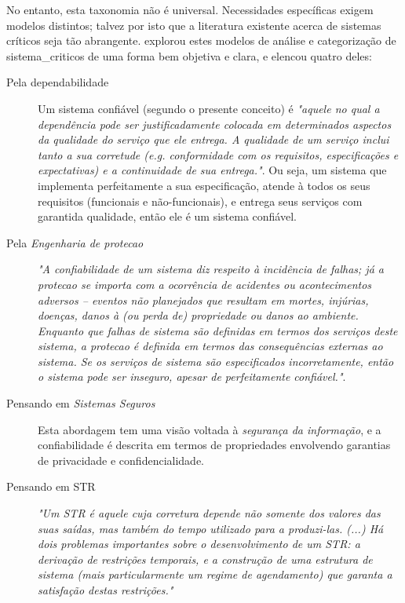     No entanto, esta taxonomia não é universal. Necessidades específicas exigem 
    modelos distintos; talvez por isto que a literatura existente acerca de 
    sistemas críticos seja tão abrangente.  
    explorou estes modelos de análise e categorização de 
    \glspl{sistema_critico} de uma forma bem objetiva e clara, e elencou quatro 
    deles:
    
    \begin{description}
        \item[Pela \Gls{dependabilidade}] Um sistema confiável 
        (segundo o presente conceito) é \emph{"aquele no qual a dependência 
        pode ser justificadamente colocada em determinados aspectos da 
        qualidade do serviço que ele entrega. A qualidade de um serviço inclui 
        tanto a sua corretude (e.g. conformidade com os requisitos, 
        especificações e expectativas) e a continuidade de sua entrega."}. Ou 
        seja, um sistema que implementa perfeitamente a sua especificação, 
        atende à todos os seus requisitos (funcionais e não-funcionais), e 
        entrega seus serviços com garantida qualidade, então ele é um sistema 
        confiável.
    
        \item[Pela \emph{Engenharia de \Gls{protecao}}] \emph{"A 
        confiabilidade de um sistema diz respeito à incidência de falhas; já a 
        \gls{protecao} se importa com a ocorrência de acidentes ou 
        acontecimentos adversos -- eventos não planejados que resultam em 
        mortes, injúrias, doenças, danos à (ou perda de) propriedade ou danos 
        ao ambiente. Enquanto que falhas de sistema são definidas em termos dos 
        serviços deste sistema, a \gls{protecao} é definida em termos das 
        consequências externas ao sistema. Se os serviços de sistema são 
        especificados incorretamente, então o sistema pode ser inseguro, apesar 
        de perfeitamente confiável."}.
        
        \item[Pensando em \emph{Sistemas Seguros}] Esta abordagem tem
        uma visão voltada à \emph{segurança da informação}, e a confiabilidade 
        é descrita em termos de propriedades envolvendo garantias de 
        privacidade e confidencialidade.
        
        \item[Pensando em \gls{STR}] \emph{"Um \gls{STR} é aquele cuja 
        corretura depende não somente dos valores das suas saídas, mas também 
        do tempo utilizado para a produzi-las. (...) Há dois problemas 
        importantes sobre o desenvolvimento de um \gls{STR}: a derivação de 
        restrições temporais, e a construção de uma estrutura de sistema (mais 
        particularmente um regime de agendamento) que garanta a satisfação 
        destas restrições."}
    \end{description}
    
